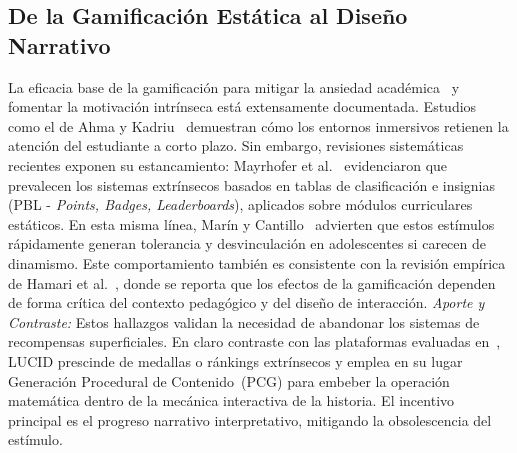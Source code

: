 \documentclass{ieeetj}
\begin{document}
\subsection{De la Gamificaci\'on Est\'atica al Dise\~no Narrativo}
La eficacia base de la gamificaci\'on para mitigar la ansiedad acad\'emica~\cite{estrada2024impacto}
y fomentar la motivaci\'on intr\'inseca est\'a extensamente documentada. Estudios como el de
Ahma y Kadriu~\cite{ahma2025exploring} demuestran c\'omo los entornos inmersivos retienen la atenci\'on del
estudiante a corto plazo. Sin embargo, revisiones sistem\'aticas recientes exponen su estancamiento:
Mayrhofer et al.~\cite{mayrhofer2025current} evidenciaron que prevalecen los sistemas extr\'insecos
basados en tablas de clasificaci\'on e insignias (PBL - \textit{Points, Badges, Leaderboards}),
aplicados sobre m\'odulos curriculares est\'aticos. En esta misma l\'inea, Mar\'in y Cantillo~\cite{marin2025gamificacion}
advierten que estos est\'imulos r\'apidamente generan tolerancia y desvinculaci\'on en adolescentes
si carecen de dinamismo. Este comportamiento tambi\'en es consistente con la revisi\'on emp\'irica
de Hamari et al.~\cite{hamari2014does}, donde se reporta que los efectos de la gamificaci\'on
dependen de forma cr\'itica del contexto pedag\'ogico y del dise\~no de interacci\'on.
\textit{Aporte y Contraste:} Estos hallazgos validan la necesidad de abandonar los sistemas de 
recompensas superficiales. En claro contraste con las plataformas evaluadas en~\cite{mayrhofer2025current,marin2025gamificacion},
LUCID prescinde de medallas o r\'ankings extr\'insecos y emplea en su lugar Generaci\'on Procedural 
de Contenido~(PCG) para embeber la operaci\'on matem\'atica dentro de la mec\'anica interactiva de la historia. 
El incentivo principal es el progreso narrativo interpretativo, mitigando la obsolescencia del est\'imulo.
\end{document}
